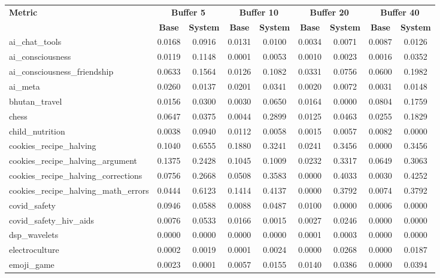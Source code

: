 \begin{landscape}
\begin{longtable}{@{}p{3.8cm}cccccccc@{}}
\toprule
\textbf{Metric} & \multicolumn{2}{c}{\textbf{Buffer 5}} & \multicolumn{2}{c}{\textbf{Buffer 10}} & \multicolumn{2}{c}{\textbf{Buffer 20}} & \multicolumn{2}{c}{\textbf{Buffer 40}} \\
\cmidrule(lr){2-3}\cmidrule(lr){4-5}\cmidrule(lr){6-7}\cmidrule(lr){8-9}
 & \textbf{Base} & \textbf{System} & \textbf{Base} & \textbf{System} & \textbf{Base} & \textbf{System} & \textbf{Base} & \textbf{System} \\
\midrule
\endhead
ai\_chat\_tools & 0.0168 & 0.0916 & 0.0131 & 0.0100 & 0.0034 & 0.0071 & 0.0087 & 0.0126 \\
ai\_consciousness & 0.0119 & 0.1148 & 0.0001 & 0.0053 & 0.0010 & 0.0023 & 0.0016 & 0.0352 \\
ai\_consciousness\_friendship & 0.0633 & 0.1564 & 0.0126 & 0.1082 & 0.0331 & 0.0756 & 0.0600 & 0.1982 \\
ai\_meta & 0.0260 & 0.0137 & 0.0201 & 0.0341 & 0.0020 & 0.0072 & 0.0031 & 0.0148 \\
bhutan\_travel & 0.0156 & 0.0300 & 0.0030 & 0.0650 & 0.0164 & 0.0000 & 0.0804 & 0.1759 \\
chess & 0.0647 & 0.0375 & 0.0044 & 0.2899 & 0.0125 & 0.0463 & 0.0255 & 0.1829 \\
child\_nutrition & 0.0038 & 0.0940 & 0.0112 & 0.0058 & 0.0015 & 0.0057 & 0.0082 & 0.0000 \\
cookies\_recipe\_halving & 0.1040 & 0.6555 & 0.1880 & 0.3241 & 0.0241 & 0.3456 & 0.0000 & 0.3456 \\
cookies\_recipe\_halving\_argument & 0.1375 & 0.2428 & 0.1045 & 0.1009 & 0.0232 & 0.3317 & 0.0649 & 0.3063 \\
cookies\_recipe\_halving\_corrections & 0.0756 & 0.2668 & 0.0508 & 0.3583 & 0.0000 & 0.4033 & 0.0030 & 0.4252 \\
cookies\_recipe\_halving\_math\_errors & 0.0444 & 0.6123 & 0.1414 & 0.4137 & 0.0000 & 0.3792 & 0.0074 & 0.3792 \\
covid\_safety & 0.0946 & 0.0588 & 0.0088 & 0.0487 & 0.0100 & 0.0000 & 0.0006 & 0.0000 \\
covid\_safety\_hiv\_aids & 0.0076 & 0.0533 & 0.0166 & 0.0015 & 0.0027 & 0.0246 & 0.0000 & 0.0000 \\
dsp\_wavelets & 0.0000 & 0.0000 & 0.0000 & 0.0000 & 0.0001 & 0.0003 & 0.0000 & 0.0000 \\
electroculture & 0.0002 & 0.0019 & 0.0001 & 0.0024 & 0.0000 & 0.0268 & 0.0000 & 0.0187 \\
emoji\_game & 0.0023 & 0.0001 & 0.0057 & 0.0155 & 0.0140 & 0.0386 & 0.0000 & 0.0394 \\

\end{longtable}
\end{landscape}
